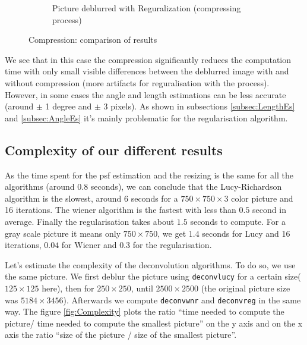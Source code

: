\begin{figure}[h]
\begin{subfigure}{0.32\textwidth}
\caption{Picture deblurred with Reguralization (compressing process)}
\label{fig:Regcom}
\end{subfigure}
\caption{Compression: comparison of results}
\end{figure}


We see that in this case the compression significantly reduces the computation time with only small visible differences between the deblurred image with and without compression (more artifacts for reguralisation with the  process). 
However, in some cases the angle and length estimations can be less accurate (around $\pm$ 1 degree and $\pm$ 3 pixels). As shown in subsections \ref{subsec:LengthEs} and \ref{subsec:AngleEs} it's mainly problematic for the regularisation algorithm.

\subsection{Complexity of our different results}

As the time spent for the psf estimation and the resizing is the same for all the algorithms (around 0.8 seconds), we can conclude that the Lucy-Richardson algorithm is the slowest, around $6 $ seconds for a $750 \times 750 \times 3$ color picture and 16 iterations. The wiener algorithm is the fastest with less than $0.5$ second in average. Finally the regularisation takes about $1.5$ seconds to compute. For a gray scale picture it means only $750 \times 750$, we get $1.4$ seconds for Lucy and 16 iterations, $0.04$ for Wiener and $0.3$ for the regularisation. 

Let's estimate the complexity of the deconvolution algorithms. To do so, we use the same picture. We first deblur the picture using \texttt{deconvlucy} for a certain size($125 \times 125$ here), then for $250 \times 250$, until $2500 \times 2500$ (the original picture  size was $5184 \times 3456$). Afterwards we compute  \texttt{deconvwnr} and \texttt{deconvreg} in the same way. The figure \ref{fig:Complexity} plots the ratio ``time needed to compute the picture/ time needed to compute the smallest picture'' on the y axis and on the x axis the ratio ``size of the picture / size of the smallest picture''. 


